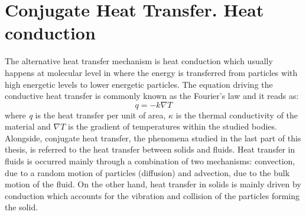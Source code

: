 \section{Conjugate Heat Transfer. Heat conduction}
The alternative heat transfer mechanism is heat conduction which usually happens at molecular level in where the energy is transferred from particles with high energetic levels to lower energetic particles. The equation driving the conductive heat transfer is commonly known as the Fourier's law and it reads as: 
\begin{equation}
	q=-k \nabla T
	\label{1.2}
\end{equation}
where \textit{q} is the heat transfer per unit of area, $\kappa$ is the thermal conductivity of the material and $\nabla T$ is the gradient of temperatures within the studied bodies.
\newline
Alongside, conjugate heat transfer, the phenomena studied in the last part of this thesis, is referred to the heat transfer between solids and fluids. Heat transfer in fluids is occurred mainly through a combination of two mechanisms: convection, due to a random motion of particles (diffusion) and advection, due to the bulk motion of the fluid. On the other hand, heat transfer in solids is mainly driven by conduction which accounts for the vibration and collision of the particles forming the solid.


